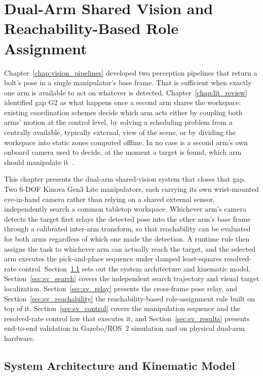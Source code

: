 \chapter{Dual-Arm Shared Vision and Reachability-Based Role Assignment}
\label{chap:shared_vision}

Chapter~\ref{chap:vision_pipelines} developed two perception pipelines that return a bolt's pose in
a single manipulator's base frame. That is sufficient when exactly one arm is available to act on
whatever is detected. Chapter~\ref{chap:lit_review} identified gap G2 as what happens once a second
arm shares the workspace: existing coordination schemes decide which arm acts either by coupling
both arms' motion at the control level, by solving a scheduling problem from a centrally available,
typically external, view of the scene, or by dividing the workspace into static zones computed
offline. In no case is a second arm's own onboard camera used to decide, at the moment a target is
found, which arm should manipulate it~\citep{sk2025sharedvision}.

This chapter presents the dual-arm shared-vision system that closes that gap. Two 6-DOF Kinova
Gen3 Lite manipulators, each carrying its own wrist-mounted eye-in-hand camera rather than relying
on a shared external sensor, independently search a common tabletop workspace. Whichever arm's
camera detects the target first relays the detected pose into the other arm's base frame through a
calibrated inter-arm transform, so that reachability can be evaluated for both arms regardless of
which one made the detection. A runtime rule then assigns the task to whichever arm can actually
reach the target, and the selected arm executes the pick-and-place sequence under damped
least-squares resolved-rate control. Section~\ref{sec:sv_architecture} sets out the system
architecture and kinematic model. Section~\ref{sec:sv_search} covers the independent search
trajectory and visual target localization. Section~\ref{sec:sv_relay} presents the cross-frame pose
relay, and Section~\ref{sec:sv_reachability} the reachability-based role-assignment rule built on
top of it. Section~\ref{sec:sv_control} covers the manipulation sequence and the resolved-rate
control law that executes it, and Section~\ref{sec:sv_results} presents end-to-end validation in
Gazebo/ROS~2 simulation and on physical dual-arm hardware.

\section{System Architecture and Kinematic Model}\label{sec:sv_architecture}

